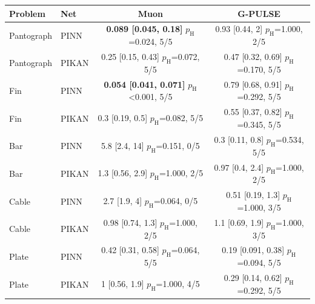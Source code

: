 \begin{tabular}{llcc}
\toprule
Problem & Net & Muon & G-PULSE\\
\midrule
Pantograph & PINN & \makecell{\textbf{0.089 [0.045, 0.18]}\\{\footnotesize $p_{\mathrm{H}}$=0.024, 5/5}} & \makecell{0.93 [0.44, 2]\\{\footnotesize $p_{\mathrm{H}}$=1.000, 2/5}}\\
Pantograph & PIKAN & \makecell{0.25 [0.15, 0.43]\\{\footnotesize $p_{\mathrm{H}}$=0.072, 5/5}} & \makecell{0.47 [0.32, 0.69]\\{\footnotesize $p_{\mathrm{H}}$=0.170, 5/5}}\\
Fin & PINN & \makecell{\textbf{0.054 [0.041, 0.071]}\\{\footnotesize $p_{\mathrm{H}}$<0.001, 5/5}} & \makecell{0.79 [0.68, 0.91]\\{\footnotesize $p_{\mathrm{H}}$=0.292, 5/5}}\\
Fin & PIKAN & \makecell{0.3 [0.19, 0.5]\\{\footnotesize $p_{\mathrm{H}}$=0.082, 5/5}} & \makecell{0.55 [0.37, 0.82]\\{\footnotesize $p_{\mathrm{H}}$=0.345, 5/5}}\\
Bar & PINN & \makecell{5.8 [2.4, 14]\\{\footnotesize $p_{\mathrm{H}}$=0.151, 0/5}} & \makecell{0.3 [0.11, 0.8]\\{\footnotesize $p_{\mathrm{H}}$=0.534, 5/5}}\\
Bar & PIKAN & \makecell{1.3 [0.56, 2.9]\\{\footnotesize $p_{\mathrm{H}}$=1.000, 2/5}} & \makecell{0.97 [0.4, 2.4]\\{\footnotesize $p_{\mathrm{H}}$=1.000, 2/5}}\\
Cable & PINN & \makecell{2.7 [1.9, 4]\\{\footnotesize $p_{\mathrm{H}}$=0.064, 0/5}} & \makecell{0.51 [0.19, 1.3]\\{\footnotesize $p_{\mathrm{H}}$=1.000, 3/5}}\\
Cable & PIKAN & \makecell{0.98 [0.74, 1.3]\\{\footnotesize $p_{\mathrm{H}}$=1.000, 2/5}} & \makecell{1.1 [0.69, 1.9]\\{\footnotesize $p_{\mathrm{H}}$=1.000, 3/5}}\\
Plate & PINN & \makecell{0.42 [0.31, 0.58]\\{\footnotesize $p_{\mathrm{H}}$=0.064, 5/5}} & \makecell{0.19 [0.091, 0.38]\\{\footnotesize $p_{\mathrm{H}}$=0.094, 5/5}}\\
Plate & PIKAN & \makecell{1 [0.56, 1.9]\\{\footnotesize $p_{\mathrm{H}}$=1.000, 4/5}} & \makecell{0.29 [0.14, 0.62]\\{\footnotesize $p_{\mathrm{H}}$=0.292, 5/5}}\\
\bottomrule
\end{tabular}